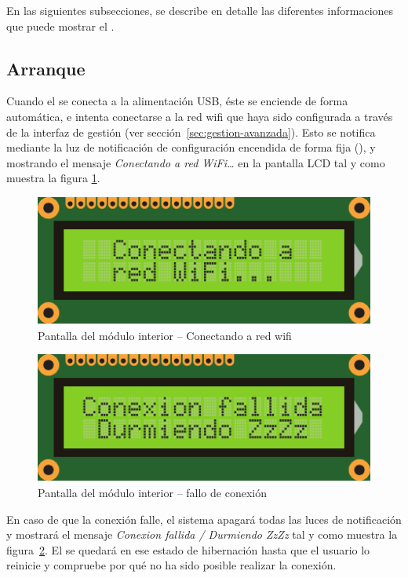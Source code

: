 En las siguientes subsecciones, se describe en detalle las diferentes informaciones que puede mostrar el \CMS.

\subsection{Arranque}

Cuando el \MIE se conecta a la alimentación USB, éste se enciende de forma automática, e intenta conectarse a la red wifi que haya sido configurada a través de la interfaz de gestión (ver sección~\ref{sec:gestion-avanzada}). Esto se notifica mediante la luz de notificación de configuración  encendida de forma fija (), y mostrando el mensaje \emph{Conectando a red WiFi\ldots} en la pantalla LCD  tal y como muestra la figura \ref{fig:screen-conn-process}.

\begin{figure}[!b]
  \centering
  \includegraphics[width=0.6\columnwidth]{images/screen-conn-process}
  \caption{Pantalla del módulo interior -- Conectando a red wifi}
  \label{fig:screen-conn-process}
\end{figure}

\begin{figure}[!b]
  \centering
  \includegraphics[width=0.6\columnwidth]{images/screen-conn-failed}
  \caption{Pantalla del módulo interior -- fallo de conexión}
  \label{fig:screen-conn-failed}
\end{figure}


En caso de que la conexión falle, el sistema apagará todas las luces de notificación y mostrará el mensaje \emph{Conexion fallida / Durmiendo ZzZz} tal y como muestra la figura~\ref{fig:screen-conn-failed}. El \MI se quedará en ese estado de hibernación hasta que el usuario lo reinicie y compruebe por qué no ha sido posible realizar la conexión.



